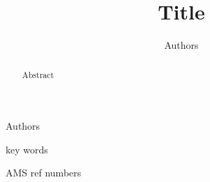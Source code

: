 \documentclass[review,onefignum,onetabnum]{siamart190516}
\begin{document}

        {Authors}

\title{Title}

\author{Authors}

\maketitle


\begin{abstract}
  Abstract
\end{abstract}

\begin{keywords}
  key words
\end{keywords}

\begin{AMS}
  AMS ref numbers
\end{AMS}




\appendix







\end{document}
